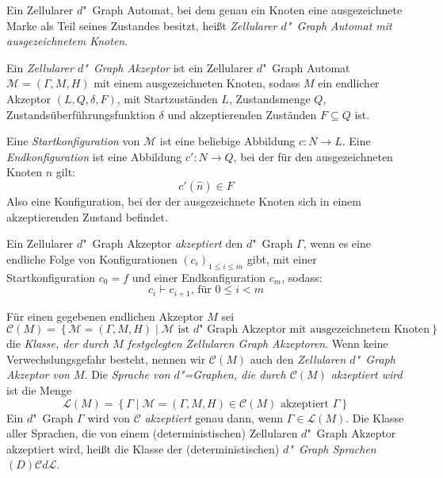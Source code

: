 \documentclass[11pt]{article}
\newcommand{\defWord}[1]{\emph{#1}}
\begin{document}
\begin{definition}[Akzeptanz]
	Ein Zellularer $d$"~Graph Automat, bei dem genau ein Knoten eine ausgezeichnete Marke als Teil seines Zustandes  besitzt, heißt \defWord{Zellularer $d$"~Graph Automat mit ausgezeichnetem Knoten}.
	
	Ein \defWord{Zellularer $d$"~Graph Akzeptor} ist ein Zellularer $d$"~Graph Automat $\mathcal{M} = \left(\Gamma, M, H \right)$ mit einem ausgezeichneten Knoten, sodass $M$ ein endlicher Akzeptor $\left(L, Q, \delta, F\right)$, mit Startzuständen $L$, Zustandsmenge $Q$, Zustandsüberführungsfunktion $\delta$ und akzeptierenden Zuständen $F \subseteq Q$ ist.
	
	Eine \defWord{Startkonfiguration} von $\mathcal{M}$ ist eine beliebige Abbildung $c : N \rightarrow L$. 
	Eine \defWord{Endkonfiguration} ist eine Abbildung $c' : N \rightarrow Q$, bei der für den ausgezeichneten Knoten $\hat{n}$ gilt: 
	\begin{displaymath}
		c'(\hat{n}) \in F
	\end{displaymath} 
	Also eine Konfiguration, bei der der ausgezeichnete Knoten sich in einem akzeptierenden Zustand befindet.
	
	Ein Zellularer $d$"~Graph Akzeptor \defWord{akzeptiert} den $d$"~Graph $\Gamma$, wenn es eine endliche Folge von Konfigurationen $\left(c_i\right)_{1 \le i \le m}$ gibt, mit einer Startkonfiguration $c_0 = f$ und einer Endkonfiguration $c_m$, sodass:
	\begin{displaymath}
		c_{i} \vdash c_{i+1} \text{, für } 0 \le i < m
	\end{displaymath}
\end{definition}

\begin{definition}[Sprachen]
	Für einen gegebenen endlichen Akzeptor $M$ sei 
	\begin{displaymath}
		\mathcal{C}(M) = \left\{\mathcal{M} = \left(\Gamma, M, H\right) \mid \mathcal{M} \text{ ist $d$"~Graph Akzeptor mit ausgezeichnetem Knoten} \right\}
	\end{displaymath} 
	die \defWord{Klasse, der durch $M$ festgelegten Zellularen Graph Akzeptoren}. 
	Wenn keine Verwechslungsgefahr besteht, nennen wir $\mathcal{C}(M)$ auch den \defWord{Zellularen $d$"~Graph Akzeptor von $M$}.
	Die \defWord{Sprache von $d$"=Graphen, die durch $\mathcal{C}(M)$ akzeptiert wird} ist die Menge 
	\begin{displaymath}
		\mathcal{L}(M) = \left\{\Gamma \mid \mathcal{M} = \left(\Gamma, M, H\right) \in \mathcal{C}(M) \text{ akzeptiert } \Gamma \right\}
	\end{displaymath}
	Ein $d$"~Graph $\Gamma$ wird von $\mathcal{C}$ \defWord{akzeptiert} genau dann, wenn $\Gamma \in \mathcal{L}(M)$.
	Die Klasse aller Sprachen, die von einem (deterministischen) Zellularen $d$"~Graph Akzeptor akzeptiert wird, heißt die Klasse der (deterministischen) \defWord{$d$"~Graph Sprachen} $(D)\mathcal{C}d\mathcal{L}$. 
\end{definition}
\end{document}
